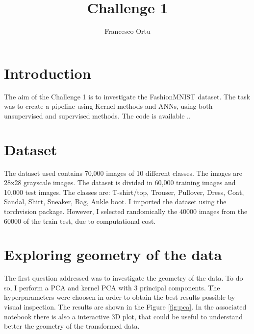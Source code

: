 \documentclass[12pt]{article}
\title{Challenge 1}
\author{Francesco Ortu}
\begin{document}
\maketitle
\begin{abstract}

\end{abstract}

\section{Introduction}
 The aim of the Challenge 1 is to investigate the FashionMNIST \cite{xiao2017/online} dataset.
 The task was to create a pipeline using Kernel methods and ANNs, using both unsupervised and supervised methods.
 The code is available ..
 \section{Dataset}
 The dataset used contains 70,000 images of 10 different classes. The images are 28x28 grayscale images. The dataset is divided in 60,000 training images and 10,000 test images. The classes are: T-shirt/top, Trouser, Pullover, Dress, Coat, Sandal, Shirt, Sneaker, Bag, Ankle boot.
 I imported the dataset using the torchvision package. However, I selected randomically the $40000$ images from the $60000$ of the train test, due to computational cost.

 \section{Exploring geometry of the data}
The first question addressed was to investigate the geometry of the data. To do so, I perform
a PCA and kernel PCA with $3$ principal components. The hyperparameters were choosen in order to obtain the best results possible by visual inspection.
The results are shown in the Figure \ref{fig:pca}. In the associated 
notebook there is also a interactive 3D plot, that could be useful to understand better the geometry of the transformed data.
\end{document}
